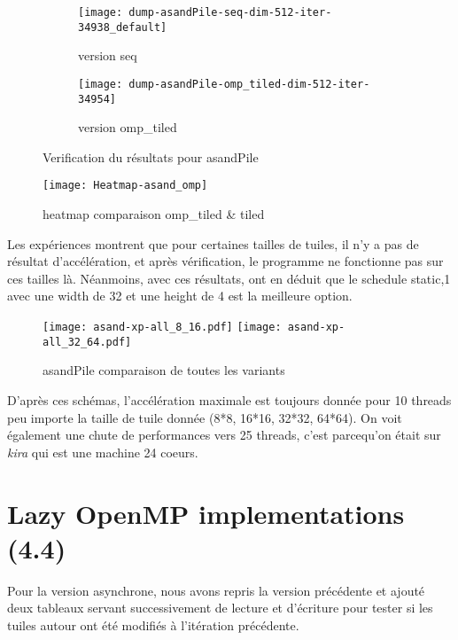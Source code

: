 \documentclass[10pt, a4paper]{article}
\begin{document}
\begin{figure}[H]
    \centering
    \begin{subfigure}{.4\textwidth}
        \texttt{[image: dump-asandPile-seq-dim-512-iter-34938\_default]}
        \caption{\small{version seq}}
    \end{subfigure}
    \begin{subfigure}{.4\textwidth}
        \texttt{[image: dump-asandPile-omp\_tiled-dim-512-iter-34954]}
        \caption{\small{version omp\_tiled}}
    \end{subfigure}
    \caption{Verification du résultats pour asandPile}
\end{figure}

\begin{figure}[H]
    \centering
    \texttt{[image: Heatmap-asand\_omp]}
    \caption{\small{heatmap comparaison omp\_tiled \& tiled}}
\end{figure}

Les expériences montrent que pour certaines tailles de tuiles, il n'y a pas de résultat d'accélération,
et après vérification, le programme ne fonctionne pas sur ces tailles là.
Néanmoins, avec ces résultats, ont en déduit que le schedule static,1 avec une width de 32 et une height
de 4 est la meilleure option.

\begin{figure}[H]
    \centering
    \texttt{[image: asand-xp-all\_8\_16.pdf]}
    \texttt{[image: asand-xp-all\_32\_64.pdf]}
    \caption{\small{asandPile comparaison de toutes les variants}}
\end{figure}

D'après ces schémas, l'accélération maximale est toujours donnée pour 10 threads peu importe la taille de
tuile donnée (8*8, 16*16, 32*32, 64*64).
On voit également une chute de performances vers 25 threads, c'est parcequ'on était sur \emph{kira}
qui est une machine 24 coeurs.


\section{Lazy OpenMP implementations (4.4)}

Pour la version asynchrone, nous avons repris la version précédente et ajouté deux tableaux
servant successivement de lecture et d'écriture pour tester si les tuiles autour ont été modifiés à
l'itération précédente.
\end{document}

